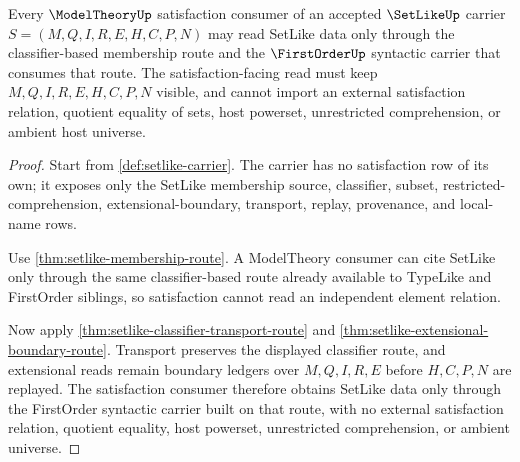 \begin{theorem}
\label{thm:setlike-root-unblock-modeltheory-satisfaction}
Every $\ModelTheoryUp$ satisfaction consumer of an accepted $\SetLikeUp$ carrier $S=(M,Q,I,R,E,H,C,P,N)$ may read SetLike data only through the classifier-based membership route and the $\FirstOrderUp$ syntactic carrier that consumes that route. The satisfaction-facing read must keep $M,Q,I,R,E,H,C,P,N$ visible, and cannot import an external satisfaction relation, quotient equality of sets, host powerset, unrestricted comprehension, or ambient host universe.
\end{theorem}
\begin{proof}
Start from \autoref{def:setlike-carrier}. The carrier has no satisfaction row of its own; it exposes only the SetLike membership source, classifier, subset, restricted-comprehension, extensional-boundary, transport, replay, provenance, and local-name rows.

Use \autoref{thm:setlike-membership-route}. A ModelTheory consumer can cite SetLike only through the same classifier-based route already available to TypeLike and FirstOrder siblings, so satisfaction cannot read an independent element relation.

Now apply \autoref{thm:setlike-classifier-transport-route} and \autoref{thm:setlike-extensional-boundary-route}. Transport preserves the displayed classifier route, and extensional reads remain boundary ledgers over $M,Q,I,R,E$ before $H,C,P,N$ are replayed. The satisfaction consumer therefore obtains SetLike data only through the FirstOrder syntactic carrier built on that route, with no external satisfaction relation, quotient equality, host powerset, unrestricted comprehension, or ambient universe.
\end{proof}

